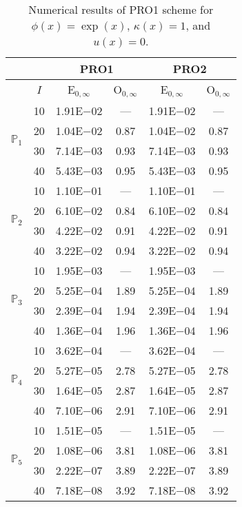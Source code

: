 \begin{table}[H]
\caption{Numerical results of PRO1 scheme for $\phi(x)=\exp(x)$, $\kappa(x)=1$, and $u(x)=0$.}
\setlength{\tabcolsep}{5pt}
\centering
\begin{tabular}{@{}l c c c c c@{}}
\toprule
 &  & \multicolumn{2}{c}{PRO1} & \multicolumn{2}{c}{PRO2}\\
\midrule
 & $I$ & E$_{0,\infty}$ & O$_{0,\infty}$ & E$_{0,\infty}$ & O$_{0,\infty}$\\
\midrule
\multirow{4}{*}{$\mathbb{P}_{1}$}
 & 10 & 1.91E$-$02 & --- & 1.91E$-$02 & ---\\
 & 20 & 1.04E$-$02 & 0.87 & 1.04E$-$02 & 0.87 \\
 & 30 & 7.14E$-$03 & 0.93 & 7.14E$-$03 & 0.93 \\
 & 40 & 5.43E$-$03 & 0.95 & 5.43E$-$03 & 0.95 \\
\midrule
\multirow{4}{*}{$\mathbb{P}_{2}$}
 & 10 & 1.10E$-$01 & --- & 1.10E$-$01 & ---\\
 & 20 & 6.10E$-$02 & 0.84 & 6.10E$-$02 & 0.84 \\
 & 30 & 4.22E$-$02 & 0.91 & 4.22E$-$02 & 0.91 \\
 & 40 & 3.22E$-$02 & 0.94 & 3.22E$-$02 & 0.94 \\
\midrule
\multirow{4}{*}{$\mathbb{P}_{3}$}
 & 10 & 1.95E$-$03 & --- & 1.95E$-$03 & ---\\
 & 20 & 5.25E$-$04 & 1.89 & 5.25E$-$04 & 1.89 \\
 & 30 & 2.39E$-$04 & 1.94 & 2.39E$-$04 & 1.94 \\
 & 40 & 1.36E$-$04 & 1.96 & 1.36E$-$04 & 1.96 \\
\midrule
\multirow{4}{*}{$\mathbb{P}_{4}$}
 & 10 & 3.62E$-$04 & --- & 3.62E$-$04 & ---\\
 & 20 & 5.27E$-$05 & 2.78 & 5.27E$-$05 & 2.78 \\
 & 30 & 1.64E$-$05 & 2.87 & 1.64E$-$05 & 2.87 \\
 & 40 & 7.10E$-$06 & 2.91 & 7.10E$-$06 & 2.91 \\
\midrule
\multirow{4}{*}{$\mathbb{P}_{5}$}
 & 10 & 1.51E$-$05 & --- & 1.51E$-$05 & ---\\
 & 20 & 1.08E$-$06 & 3.81 & 1.08E$-$06 & 3.81 \\
 & 30 & 2.22E$-$07 & 3.89 & 2.22E$-$07 & 3.89 \\
 & 40 & 7.18E$-$08 & 3.92 & 7.18E$-$08 & 3.92 \\
\bottomrule
\end{tabular}
\label{Table:PRO:Test1}
\end{table}
